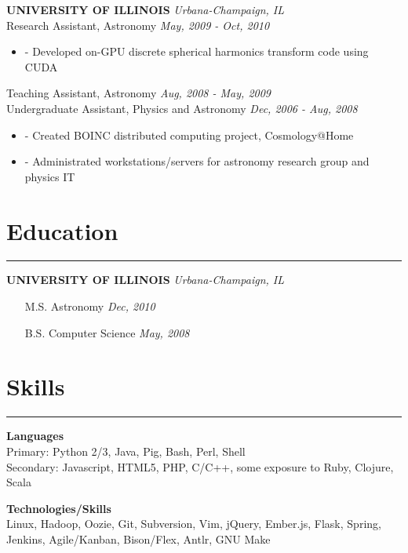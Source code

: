 \documentclass[a4paper,11pt]{article}
\newenvironment{pitemize}{
\begin{itemize}
\setlength{\itemsep}{.01in}
\setlength{\parskip}{.01in}
}
{\end{itemize}}
\begin{document}
\vspace{0.2in}
\textbf{UNIVERSITY OF ILLINOIS} \hfill \textit{Urbana-Champaign, IL} \\
Research Assistant, Astronomy \hfill \textit{May, 2009 - Oct, 2010}
\begin{pitemize}
\item[-]Developed on-GPU discrete spherical harmonics transform code using CUDA
\end{pitemize}
Teaching Assistant, Astronomy \hfill \textit{Aug, 2008 - May, 2009} \\
Undergraduate Assistant, Physics and Astronomy \hfill \textit{Dec, 2006 - Aug, 2008}
\begin{pitemize}
\item[-]Created BOINC distributed computing project, Cosmology@Home
\item[-]Administrated workstations/servers for astronomy research group and physics IT
\end{pitemize}


\section*{\huge{Education}}
\hrule
\vspace{0.1in}
\textbf{UNIVERSITY OF ILLINOIS} \hfill \textit{Urbana-Champaign, IL}
\begin{itemize}
\setlength{\itemsep}{0.0in}
\item[]M.S. Astronomy \hfill \textit{Dec, 2010}
\item[]B.S. Computer Science \hfill \textit{May, 2008}
\end{itemize}

\section*{\huge{Skills}}
\hrule
\vspace{0.1in}
\textbf{Languages} \\
Primary: Python 2/3, Java, Pig, Bash, Perl, Shell \\
Secondary: Javascript, HTML5, PHP, C/C++, some exposure to Ruby, Clojure, Scala

\vspace{0.1in}

\textbf{Technologies/Skills} \\
Linux, Hadoop, Oozie, Git, Subversion, Vim, jQuery, Ember.js, Flask, Spring, Jenkins, Agile/Kanban, Bison/Flex, Antlr, GNU Make
\end{document}
